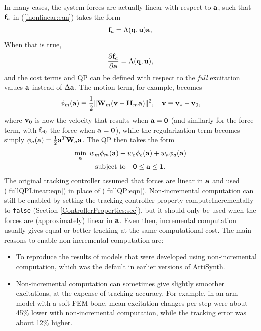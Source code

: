 In many cases, the system forces are actually linear with respect to
${\bf a}$, such that ${\bf f}_a$ in (\ref{fnonlinear:eqn}) takes the form
%
\begin{equation}
{\bf f}_a = \Lambda ({\bf q}, {\bf u}) {\bf a},
\label{flinearInA:eqn}	
\end{equation}
%
When that is true,
%
\begin{equation*}
\frac{\partial {\bf f}_a}{\partial {\bf a}} = \Lambda ({\bf q}, {\bf u}),
\end{equation*}
%
and the cost terms and QP can be defined with respect to the
{\it full} excitation values ${\bf a}$ instead of $\Delta{\bf a}$. The motion term,
for example, becomes
%
\begin{equation*}
\phi_m({\bf a}) \equiv \frac{1}{2} \| {\bf W}_m (\bar{{\bf v}} - {\bf H}_m {\bf a}) \|^2, \quad
\bar{{\bf v}} \equiv {\bf v}_* - {\bf v}_0,
\end{equation*}
%
where ${\bf v}_0$ is now the velocity that results when ${\bf a} = {\bf 0}$
(and similarly for the force term, with ${\bf f}_{e0}$ the force when ${\bf a} = {\bf
0}$), while the regularization term becomes simply $\phi_a({\bf a}) = \frac{1}{2}
{\bf a}^T {\bf W}_a {\bf a}$. The QP then takes the form
%
\begin{gather}
\min_{{\bf a}} \; w_m \phi_m({\bf a}) + 
w_e \phi_e ({\bf a}) + w_a \phi_a ({\bf a}) \notag \\
\text{subject to} \quad {\bf 0} \le {\bf a} \le {\bf 1}.
\label{fullQPLinear:eqn}
\end{gather}
%
The original tracking controller assumed that forces are linear in ${\bf a}$ and
used (\ref{fullQPLinear:eqn}) in place of (\ref{fullQP:eqn}).
Non-incremental computation can still be enabled by setting the tracking
controller property {\sf computeIncrementally} to {\tt false} (Section
\ref{ControllerProperties:sec}), but it should only be used when the forces
are (approximately) linear in ${\bf a}$. Even then, incremental computation
usually gives equal or better tracking at the same computational cost.
The main reasons to enable non-incremental computation are:
%
\begin{itemize}

\item To reproduce the results of models that were developed using
non-incremental computation, which was the default in earlier versions of
ArtiSynth.

\item Non-incremental computation can sometimes give slightly smoother
excitations, at the expense of tracking accuracy. For example, in an arm model
with a soft FEM bone, mean excitation changes per step were about 45\% lower
with non-incremental computation, while the tracking error was about 12\%
higher.

\end{itemize}

